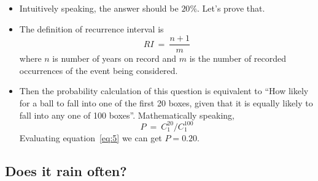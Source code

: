 \documentclass[12pt]{article}
\begin{document}
\begin{itemize}
\item Intuitively speaking, the answer should be $20\%$. Let's prove
  that. 
\item The definition of recurrence interval is
  \begin{equation}
    \label{eq:4}
    RI~=~\frac{n+1}{m}
  \end{equation}
  where $n$ is number of years on record and $m$ is the number of
  recorded occurrences of the event being considered.
\item Then the probability calculation of this question is equivalent
  to ``How likely for a ball to fall into one of the first 20 boxes,
  given that it is equally likely to fall into any one of 100
  boxes''. Mathematically speaking,
  \begin{equation}
    \label{eq:5}
    P~=~C^{20}_{1}/C^{100}_{1}
  \end{equation}
  Evaluating equation~\eqref{eq:5} we can get $P=0.20$.
\end{itemize}

\subsection{Does it rain often?}
\label{sec:does-it-rain}
\end{document}
